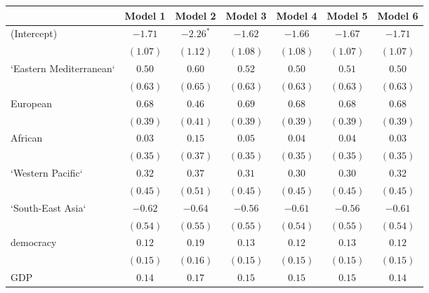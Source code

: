 
\begin{table}[!h]
\begin{center}
\begin{tabular}{l c c c c c c }
\toprule
 & Model 1 & Model 2 & Model 3 & Model 4 & Model 5 & Model 6 \\
\midrule
(Intercept)             & $-1.71$      & $-2.26^{*}$  & $-1.62$      & $-1.66$      & $-1.67$      & $-1.71$      \\
                        & $(1.07)$     & $(1.12)$     & $(1.08)$     & $(1.08)$     & $(1.07)$     & $(1.07)$     \\
`Eastern Mediterranean` & $0.50$       & $0.60$       & $0.52$       & $0.50$       & $0.51$       & $0.50$       \\
                        & $(0.63)$     & $(0.65)$     & $(0.63)$     & $(0.63)$     & $(0.63)$     & $(0.63)$     \\
European                & $0.68$       & $0.46$       & $0.69$       & $0.68$       & $0.68$       & $0.68$       \\
                        & $(0.39)$     & $(0.41)$     & $(0.39)$     & $(0.39)$     & $(0.39)$     & $(0.39)$     \\
African                 & $0.03$       & $0.15$       & $0.05$       & $0.04$       & $0.04$       & $0.03$       \\
                        & $(0.35)$     & $(0.37)$     & $(0.35)$     & $(0.35)$     & $(0.35)$     & $(0.35)$     \\
`Western Pacific`       & $0.32$       & $0.37$       & $0.31$       & $0.30$       & $0.30$       & $0.32$       \\
                        & $(0.45)$     & $(0.51)$     & $(0.45)$     & $(0.45)$     & $(0.45)$     & $(0.45)$     \\
`South-East Asia`       & $-0.62$      & $-0.64$      & $-0.56$      & $-0.61$      & $-0.56$      & $-0.61$      \\
                        & $(0.54)$     & $(0.55)$     & $(0.55)$     & $(0.54)$     & $(0.55)$     & $(0.54)$     \\
democracy               & $0.12$       & $0.19$       & $0.13$       & $0.12$       & $0.13$       & $0.12$       \\
                        & $(0.15)$     & $(0.16)$     & $(0.15)$     & $(0.15)$     & $(0.15)$     & $(0.15)$     \\
GDP                     & $0.14$       & $0.17$       & $0.15$       & $0.15$       & $0.15$       & $0.14$       \\

\end{tabular}
\end{center}
\end{table}
